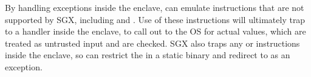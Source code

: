 By handling exceptions inside the enclave, \graphenesgx{} can emulate instructions that are not supported by SGX, including  and .
Use of these instructions will ultimately trap to a handler inside the enclave,
to call out to the OS for actual values, which are treated as untrusted input and are checked.
SGX also traps any  or  instructions inside the enclave,
so \graphenesgx{} can restrict the \linuxapis{} in a static binary
and redirect to \thelibos{} as an exception.



